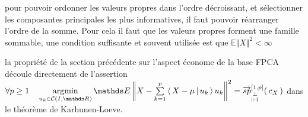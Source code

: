 
\begin{rem}
    pour pouvoir ordonner les valeurs propres dans l'ordre décroissant, et sélectionner les composantes principales les plus informatives, il faut pouvoir réarranger l'ordre de la somme. Pour cela il faut que les valeurs propres forment une famille sommable, une condition suffisante et souvent utilisée est que $\mathds E \Vert X \Vert^2 < \infty$ 
\end{rem}

\begin{rem}
    la propriété de la section précédente sur l'aspect économe de la base FPCA découle directement de l'assertion $\forall p \geq 1 
    \quad
    \argmin\limits_{u_k \in \mathcal C(I, \mathds R)} \mathds E \left\Vert X - \sum\limits_{k=1}^p \prodscal {X - \mu} {u_k} u_k \right\Vert^2 = \overrightarrow{sp}_{\orthonormal}^{[1,p]}( \, c_X \, )$ dans le théorème de Karhunen-Loeve.
\end{rem}


